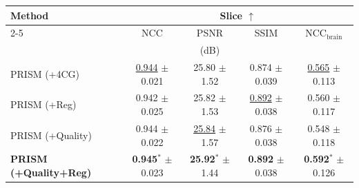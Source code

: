 \begin{tabular}{lcccc}
\toprule
Method & \multicolumn{4}{c}{Slice $\uparrow$} \\
\cmidrule(lr){2-5}
 & NCC & PSNR & SSIM & NCC$_{\mathrm{brain}}$ \\
 &  & (dB) &  &  \\
\midrule
PRISM (+4CG) & \underline{0.944} {\tiny$\pm$0.021} & 25.80 {\tiny$\pm$1.52} & 0.874 {\tiny$\pm$0.039} & \underline{0.565} {\tiny$\pm$0.113} \\
PRISM (+Reg) & 0.942 {\tiny$\pm$0.025} & 25.82 {\tiny$\pm$1.53} & \underline{0.892} {\tiny$\pm$0.038} & 0.560 {\tiny$\pm$0.117} \\
PRISM (+Quality) & 0.944 {\tiny$\pm$0.022} & \underline{25.84} {\tiny$\pm$1.57} & 0.876 {\tiny$\pm$0.038} & 0.548 {\tiny$\pm$0.118} \\
\textbf{PRISM (+Quality+Reg)} & \textbf{0.945}$^{*}$ {\tiny$\pm$0.023} & \textbf{25.92}$^{*}$ {\tiny$\pm$1.44} & \textbf{0.892} {\tiny$\pm$0.038} & \textbf{0.592}$^{*}$ {\tiny$\pm$0.126} \\
\bottomrule
\end{tabular}
